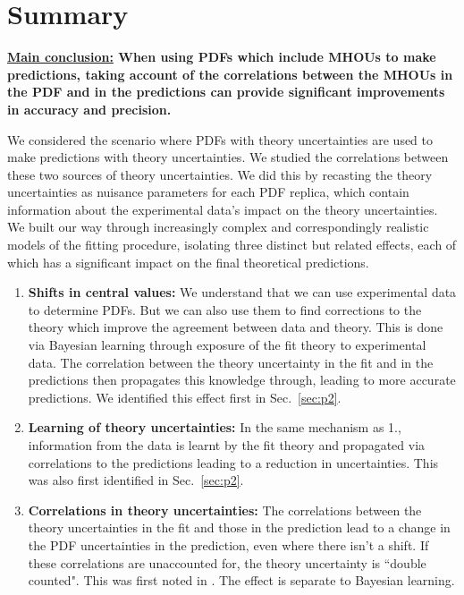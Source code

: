 \newpage
\section{Summary}
\label{sec:p5}

{\bf \underline{Main conclusion:} When using PDFs which include MHOUs to make predictions, taking account of the correlations between the MHOUs in the PDF and in the predictions can provide significant improvements in accuracy and precision.}

We considered the scenario where PDFs with theory uncertainties are used to make predictions with theory uncertainties. We studied the correlations between these two sources of theory uncertainties. We did this by recasting the theory uncertainties as nuisance parameters for each PDF replica, which contain information about the experimental data's impact on the theory uncertainties. We built our way through increasingly complex and correspondingly realistic models of the fitting procedure, isolating three distinct but related effects, each of which has a significant impact on the final theoretical predictions.

\begin{enumerate}
\item {\bf Shifts in central values: } We understand that we can use experimental data to determine PDFs. But we can also use them to find corrections to the theory which improve the agreement between data and theory. This is done via Bayesian learning through exposure of the fit theory to experimental data. The correlation between the theory uncertainty in the fit and in the predictions then propagates this knowledge through, leading to more accurate predictions. We identified this effect first in Sec.~\ref{sec:p2}.
\item {\bf Learning of theory uncertainties: } In the same mechanism as 1., information from the data is learnt by the fit theory and propagated via correlations to the predictions leading to a reduction in uncertainties. This was also first identified in Sec.~\ref{sec:p2}.
\item {\bf Correlations in theory uncertainties: }The correlations between the theory uncertainties in the fit and those in the prediction lead to a change in the PDF uncertainties in the prediction, even where there isn't a shift. If these correlations are unaccounted for, the theory uncertainty is ``double counted". This was first noted in \cite{Harland-Lang:2018bxd}. The effect is separate to Bayesian learning.
\end{enumerate}

